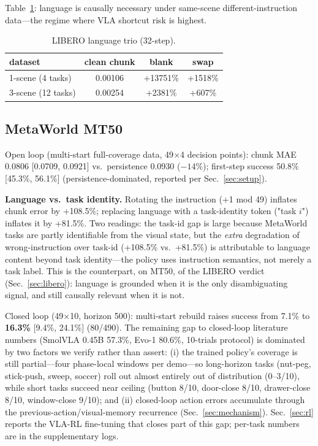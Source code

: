 \documentclass[10pt,twocolumn]{article}
\begin{document}
Table~\ref{tab:trio}: language is causally necessary under same-scene
different-instruction data---the regime where VLA shortcut risk is highest.

\begin{table}[t]
\centering\small
\caption{LIBERO language trio (32-step).}
\label{tab:trio}
\begin{tabular}{lccc}
\toprule
dataset & clean chunk & blank & swap \\
\midrule
1-scene (4 tasks) & 0.00106 & +13751\% & +1518\%\\
3-scene (12 tasks) & 0.00254 & +2381\% & +607\%\\
\bottomrule
\end{tabular}
\end{table}

\subsection{MetaWorld MT50}
\label{sec:mw}
Open loop (multi-start full-coverage data, 49$\times$4 decision points):
chunk MAE 0.0806 [0.0709, 0.0921] vs.\ persistence 0.0930 ($-14\%$);
first-step success 50.8\% [45.3\%, 56.1\%] (persistence-dominated,
reported per Sec.~\ref{sec:setup}).

\textbf{Language vs.\ task identity.} Rotating the instruction (+1 mod 49)
inflates chunk error by +108.5\%; replacing language with a task-identity token
("task $i$") inflates it by +81.5\%. Two readings: the task-id gap is large
because MetaWorld tasks are partly identifiable from the visual state, but the
\emph{extra} degradation of wrong-instruction over task-id (+108.5\% vs.\
+81.5\%) is attributable to language content beyond task identity---the
policy uses instruction semantics, not merely a task label. This is the
counterpart, on MT50, of the LIBERO verdict (Sec.~\ref{sec:libero}):
language is grounded when it is the only disambiguating signal, and still
causally relevant when it is not.

Closed loop (49$\times$10, horizon 500): multi-start rebuild raises success
from 7.1\% to \textbf{16.3\%} [9.4\%, 24.1\%] (80/490). The remaining gap to
closed-loop literature numbers (SmolVLA 0.45B 57.3\%, Evo-1 80.6\%,
10-trials protocol) is dominated by two factors we verify rather than assert:
(i) the trained policy's coverage is still partial---four phase-local windows
per demo---so long-horizon tasks (nut-peg, stick-push, sweep, soccer) roll
out almost entirely out of distribution (0--3/10), while short tasks succeed
near ceiling (button 8/10, door-close 8/10, drawer-close 8/10,
window-close 9/10); and (ii) closed-loop action errors accumulate through
the previous-action/visual-memory recurrence (Sec.~\ref{sec:mechanism}).
Sec.~\ref{sec:rl} reports the VLA-RL fine-tuning that closes part of this
gap; per-task numbers are in the supplementary logs.
\end{document}
